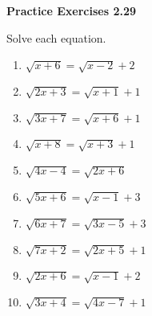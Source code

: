 \vspace{1ex}
\noindent\textbf{Practice Exercises 2.29}

\vspace{0.75ex}

Solve each equation.

\begin{multicols}{2}
\begin{enumerate}[noitemsep, label = \color{blue}\arabic*. ]
    \item \( \sqrt{x + 6} = \sqrt{x - 2} + 2 \)
    \item \( \sqrt{2x + 3} = \sqrt{x + 1} + 1 \)
    \item \( \sqrt{3x + 7} = \sqrt{x + 6} + 1 \)
    \item \( \sqrt{x + 8} = \sqrt{x + 3} + 1 \)
    \item \( \sqrt{4x - 4} = \sqrt{2x + 6} \)
    \item \( \sqrt{5x + 6} = \sqrt{x - 1} + 3 \)
    \item \( \sqrt{6x + 7} = \sqrt{3x - 5} + 3 \)
    \item \( \sqrt{7x + 2} = \sqrt{2x + 5} + 1 \)
    \item \( \sqrt{2x + 6} = \sqrt{x - 1} + 2 \)
    \item \( \sqrt{3x + 4} = \sqrt{4x - 7} + 1 \)
\end{enumerate}
\end{multicols}

